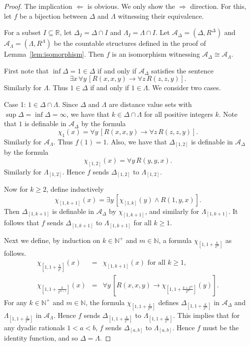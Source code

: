 \documentclass{amsart}
\theoremstyle{definition}
\theoremstyle{remark}
\begin{document}
\begin{proof} The implication $\Leftarrow$ is obvious. We only show the $\Rightarrow$ direction. For this, let $f$ be a bijection between $\Delta$ and $\Lambda$ witnessing their equivalence. 

For a subset $I\subseteq \mathbb{R}$, let $\Delta_I=\Delta\cap I$ and $\Lambda_I=\Lambda\cap I$. Let $\mathcal{A}_\Delta=(\Delta, R^\Delta)$ and $\mathcal{A}_\Lambda=(\Lambda, R^\Lambda)$ be the countable structures defined in the proof of Lemma~\ref{lem:isomorphism}. Then $f$ is an isomorphism witnessing $\mathcal{A}_\Delta\cong \mathcal{A}_\Lambda$. 

First note that $\inf\Delta=1\in \Delta$ if and only if $\mathcal{A}_\Delta$ satisfies the sentence
$$ \exists x\, \forall y\, [ R(x, x, y)\rightarrow \forall z\, R(z, z, y)]. $$
Similarly for $\Lambda$. Thus $1\in \Delta$ if and only if $1\in \Lambda$. We consider two cases.

{\sc Case 1}: $1\in \Delta\cap \Lambda$. Since $\Delta$ and $\Lambda$ are distance value sets with $\sup\Delta=\inf\Delta=\infty$, we have that $k\in \Delta\cap \Lambda$ for all positive integers $k$. Note that $1$ is definable in $\mathcal{A}_\Delta$ by the formula
$$ \chi_1(x)=\forall y\, [ R(x, x, y)\rightarrow \forall z\, R(z, z, y)]. $$
Similarly for $\mathcal{A}_\Lambda$. Thus $f(1)=1$. Also, we have that $\Delta_{[1,2]}$ is definable in $\mathcal{A}_\Delta$ by the formula
$$ \chi_{[1,2]}(x)=\forall y\, R(y,y,x). $$
Similarly for $\Lambda_{[1,2]}$. Hence $f$ sends $\Delta_{[1,2]}$ to $\Lambda_{[1,2]}$. 

Now for $k\geq 2$, define inductively 
$$ \chi_{[1,k+1]}(x)=\exists y\, [\chi_{[1,k]}(y)\wedge R(1,y,x)]. $$
Then $\Delta_{[1,k+1]}$ is definable in $\mathcal{A}_\Delta$ by $\chi_{[1,k+1]}$, and similarly for $\Lambda_{[1,k+1]}$. It follows that $f$ sends $\Delta_{[1,k+1]}$ to $\Lambda_{[1,k+1]}$ for all $k\geq 1$.

Next we define, by induction on $k\in\mathbb{N}^+$ and $m\in\mathbb{N}$, a formula $\chi_{[1,1+\frac{k}{2^m}]}$ as follows.
$$\begin{array}{rcl} \chi_{[1, 1+\frac{k}{2^0}]}(x)&=&\chi_{[1, k+1]}(x) \mbox{ for all $k\geq 1$,} \\
\chi_{[1,1+\frac{k}{2^{m+1}}]}(x)&=& \forall y\, [R(x,x,y)\rightarrow \chi_{[1,1+\frac{k+2^m}{2^m}]}(y)].
\end{array}
$$
For any $k\in\mathbb{N}^+$ and $m\in\mathbb{N}$, the formula $\chi_{[1, 1+\frac{k}{2^m}]}$ defines $\Delta_{[1,1+\frac{k}{2^m}]}$ in $\mathcal{A}_\Delta$ and $\Lambda_{[1,1+\frac{k}{2^m}]}$ in $\mathcal{A}_\Lambda$. Hence $f$ sends $\Delta_{[1,1+\frac{k}{2^m}]}$ to $\Lambda_{[1,1+\frac{k}{2^m}]}$. This implies that for any dyadic rationals $1<a<b$, $f$ sends $\Delta_{[a,b]}$ to $\Lambda_{[a,b]}$. Hence $f$ must be the identity function, and so $\Delta=\Lambda$.


\end{proof}
\end{document}
